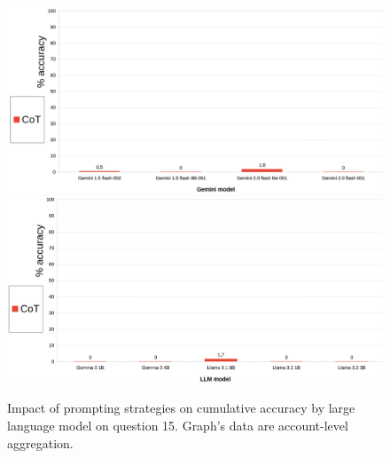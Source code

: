 \documentclass[12pt]{article}
\begin{document}
\begin{figure}[H]
    \centering
            \includegraphics[width=1\textwidth]{q303Gemini.png}
            \includegraphics[width=1\textwidth]{q303Other.png}
    \caption[Accuracy on Question 15 by LLM]{Impact of prompting strategies on cumulative accuracy by large language model on question 15. Graph's data are account-level aggregation.}
    \end{figure} 

\vspace{2cm}
\end{document}
